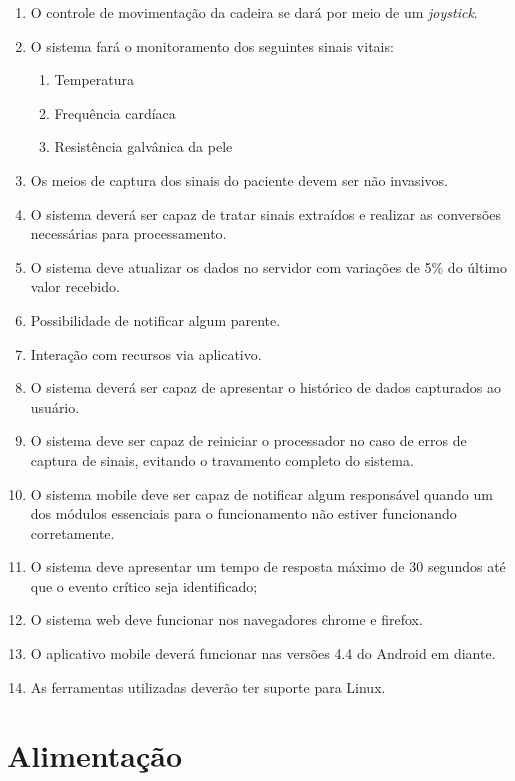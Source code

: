 \begin{enumerate}[resume*]
  \item O controle de movimentação da cadeira se dará por meio de um \textit{joystick}.
  \item O sistema fará o monitoramento dos seguintes sinais vitais:
    \begin{enumerate}[resume*]
      \item Temperatura
      \item Frequência cardíaca
      \item Resistência galvânica da pele
    \end{enumerate}
  \item Os meios de captura dos sinais do paciente devem ser não invasivos.
  \item O sistema deverá ser capaz de tratar sinais extraídos e realizar as
    conversões necessárias para processamento.
  \item O sistema deve atualizar os dados no servidor com variações de 5\% do
    último valor recebido.
  \item Possibilidade de notificar algum parente.
  \item Interação com recursos via aplicativo.
  \item O sistema deverá ser capaz de apresentar o histórico de dados
    capturados ao usuário.
  \item O sistema deve ser capaz de reiniciar o processador no caso de erros de
    captura de sinais, evitando o travamento completo do sistema.
  \item O sistema mobile deve ser capaz de notificar algum responsável quando
    um dos módulos essenciais para o funcionamento não estiver funcionando corretamente.
  \item O sistema deve apresentar um tempo de resposta máximo de 30 segundos
    até que o evento crítico seja identificado;
  \item O sistema web deve funcionar nos navegadores chrome e firefox.
  \item O aplicativo mobile deverá funcionar nas versões 4.4 do Android em diante.
  \item As ferramentas utilizadas deverão ter suporte para Linux.
\end{enumerate}

\section{Alimentação}

